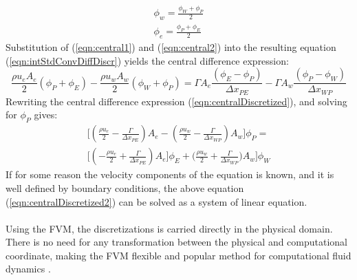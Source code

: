 \documentclass[a4paper, 12pt]{report}
\begin{document}
\begin{eqnarray}
\label{eqn:central1}
\phi_w = \frac{\phi_W + \phi_P}{2} \\ 
\label{eqn:central2}
\phi_e = \frac{\phi_P + \phi_E}{2} 
\end{eqnarray}
Substitution of (\ref{eqn:central1}) and (\ref{eqn:central2}) into the resulting equation (\ref{eqn:intStdConvDiffDiscr}) yields the central difference expression:
\begin{equation}
\frac{\rho u_e A_e}{2} (\phi_P + \phi_E) - \frac{\rho u_w A_w}{2} (\phi_W + \phi_P) = \Gamma A_e \frac{(\phi_E - \phi_P)}{\Delta x_{PE}} - \Gamma A_w \frac{(\phi_P - \phi_W)}{\Delta x_{WP}}
\label{eqn:centralDiscretized}
\end{equation}
Rewriting the central difference expression (\ref{eqn:centralDiscretized}), and solving for  $\phi_P$ gives:
\begin{eqnarray}
\Big[(\frac{\rho u_e}{2} - \frac{\Gamma}{\Delta x_{PE}} )A_e  - (\frac{\rho u_w}{2} - \frac{\Gamma}{\Delta x_{WP}} )A_w \Big]\phi_P = \nonumber \\ 
\Big[(- \frac{\rho u_e}{2} + \frac{\Gamma}{\Delta x_{PE}})A_e\Big]\phi_E + \Big(\frac{\rho u_w}{2} + \frac{\Gamma}{\Delta x_{WP}} )A_w \Big]\phi_W
\label{eqn:centralDiscretized2}
\end{eqnarray}
If for some reason the velocity components of the equation is known, and it is well defined by boundary conditions, the above equation (\ref{eqn:centralDiscretized2}) can be solved as a system of linear equation.\\
\\
Using the FVM, the discretizations is carried directly in the physical domain. There is no need for any transformation between the physical and computational coordinate, making the FVM flexible and popular method for computational fluid dynamics \cite{CFDOpenFOAM}.
\end{document}
